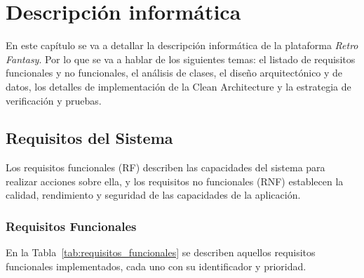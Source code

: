 \chapter{Descripción informática}
\label{chap:descripcion_informatica}

En este capítulo se va a detallar la descripción informática de la plataforma \textit{Retro Fantasy}. Por lo que se va a hablar de los siguientes temas: el listado de requisitos funcionales y no funcionales, el análisis de clases, el diseño arquitectónico y de datos, los detalles de implementación de la Clean Architecture y la estrategia de verificación y pruebas.


\section{Requisitos del Sistema}
\label{sec:requisitos}

Los requisitos funcionales (RF) describen las capacidades del sistema para realizar acciones sobre ella, y los requisitos no funcionales (RNF) establecen la calidad, rendimiento y seguridad de las capacidades de la aplicación.

\subsection{Requisitos Funcionales}
En la Tabla~\ref{tab:requisitos_funcionales} se describen aquellos requisitos funcionales implementados, cada uno con su identificador y prioridad.

